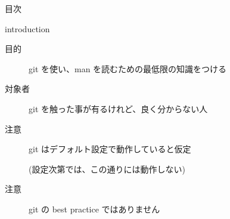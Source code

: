 % 
% 
% 
% 

\begin{frame}{}{}
  \titlepage
\end{frame}

\begin{frame}{目次}{}
  \tableofcontents
\end{frame}

\begin{frame}{introduction}{}

  \begin{description}

  \item[目的] git を使い、man を読むための最低限の知識をつける
  \item[対象者] git を触った事が有るけれど、良く分からない人
  \item[注意] git はデフォルト設定で動作していると仮定

    (設定次第では、この通りには動作しない)
  \item[注意] \alert{git の best practice ではありません}

  \end{description}

\end{frame}
